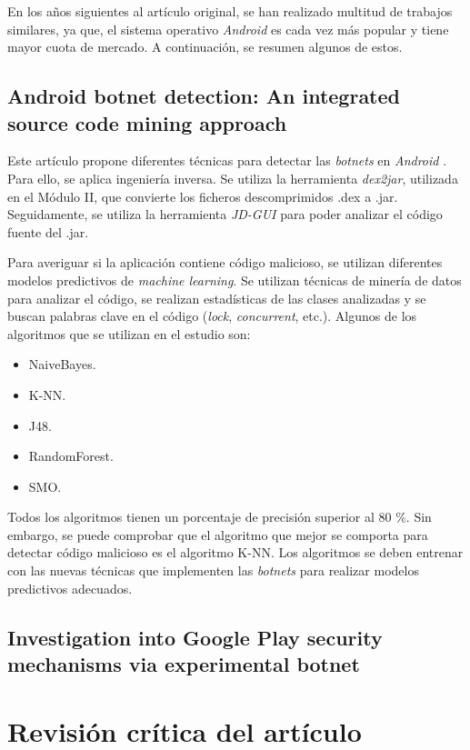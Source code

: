 \documentclass[a4paper,11pt]{report}
\begin{document}
En los años siguientes al artículo original, se han realizado multitud de trabajos similares, ya que, el sistema operativo \emph{Android} es cada vez más popular y tiene mayor cuota de mercado. A continuación, se resumen algunos de estos.

\section*{Android botnet detection: An integrated source code mining approach}

Este artículo propone diferentes técnicas para detectar las \emph{botnets} en \emph{Android} \cite{posterior1}. Para ello, se aplica ingeniería inversa. Se utiliza la herramienta \emph{dex2jar}, utilizada en el Módulo II, que convierte los ficheros descomprimidos .dex a .jar. Seguidamente, se utiliza la herramienta \emph{JD-GUI} para poder analizar el código fuente del .jar.

Para averiguar si la aplicación contiene código malicioso, se utilizan diferentes modelos predictivos de \emph{machine learning}. Se utilizan técnicas de minería de datos para analizar el código, se realizan estadísticas de las clases analizadas y se buscan palabras clave en el código (\emph{lock}, \emph{concurrent}, etc.). Algunos de los algoritmos que se utilizan en el estudio son:

\begin{itemize}
\item NaiveBayes.
\item K-NN.
\item J48.
\item RandomForest.
\item SMO.
\end{itemize}

Todos los algoritmos tienen un porcentaje de precisión superior al 80 \%{}. Sin embargo, se puede comprobar que el algoritmo que mejor se comporta para detectar código malicioso es el algoritmo K-NN. Los algoritmos se deben entrenar con las nuevas técnicas que implementen las \emph{botnets} para realizar modelos predictivos adecuados.

\section*{Investigation into Google Play security mechanisms via experimental botnet}


\chapter{Revisión crítica del artículo}
\end{document}
